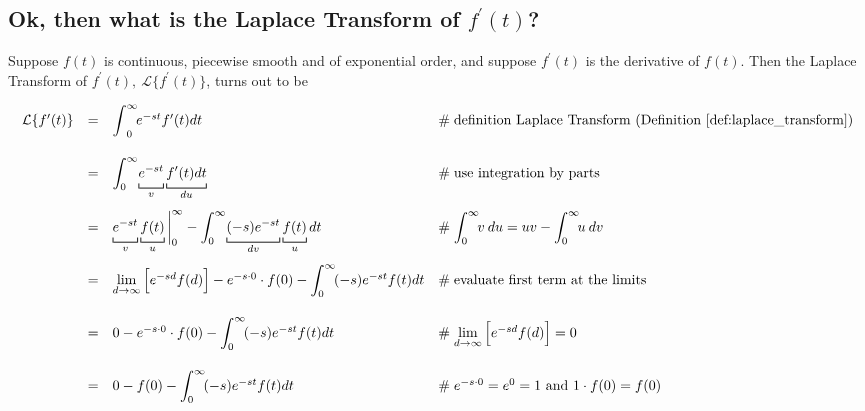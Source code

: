 \documentclass{article}
\theoremstyle{definition}
\begin{document}
\newpage

\subsection{Ok, then what is the Laplace Transform of $f^\prime (t)$?}
\label{sec:f_prime}
Suppose $f(t)$ is continuous, piecewise smooth and of exponential
order, and suppose $f^\prime(t)$ is the derivative of
$f(t)$. Then the Laplace Transform of $f^\prime(t), \:
\mathcal{L}\{f^\prime(t)\}$, turns out to be

\begin{equation*}
\begin{array}{lllll}
\mathcal{L}\{f^\prime(t)\}
&=& \mathlarger{\int} ^\infty_0 \! e^{-st}  f^\prime(t) dt
                                &\mathrel{\#} \text{definition Laplace Transform (Definition \ref{def:laplace_transform})} \\ 
[20pt] 
&=& \mathlarger{\int}^\infty_0 \! \underbracket [0.15 ex] {\strut
e^{-st}}_{v}  \underbracket [0.15 ex] {\strut f^\prime(t)
dt}_{du}
                                &\mathrel{\#} \text{use integration by parts} \\  
[20pt] 
&=& \underbracket [0.15 ex] {\strut e^{-st}}_{v}  \underbracket [0.15 ex] {\strut f(t)}_{u} \bigg |^\infty_0   -   
        \mathlarger{\int}^\infty_0 \! \underbracket [0.15 ex] {\strut (-s) e^{-st}}_{dv}  \underbracket [0.15 ex] {\strut f(t)}_{u} dt 
                                &\mathrel{\#} \mathlarger{\int}_0^\infty \! v \: du = uv - \mathlarger{\int}_0^\infty \! u \: dv \\ 
[20pt]                                                                                                                                                                                               %
&=& \lim\limits_{d \to \infty}\Big [e^{-sd} f(d) \Big ] - e^{-s
\cdot 0} \cdot f(0) - \mathlarger{\int}^\infty_0 \!  (-s) e^{-st} f(t) dt
                                &\mathrel{\#} \text{evaluate first term at the limits} \\
[20pt]
&=& 0  - e^{-s \cdot 0} \cdot f(0)  - \mathlarger{\int}^\infty_0 \!  (-s) e^{-st}  f(t) dt
                                &\mathrel{\#} \lim\limits_{d \to \infty}\Big [e^{-sd} f(d) \Big ] = 0 \\
[20pt] 
&=& 0 - f(0) - \mathlarger{\int}^\infty_0 \!  (-s) e^{-st}  f(t) dt
                                &\mathrel{\#} e^{-s \cdot 0} =
                                e^0 = 1 \text{ and } 1 \cdot f(0)
                                = f(0) \\

\end{array}
\end{equation*}
\end{document}

